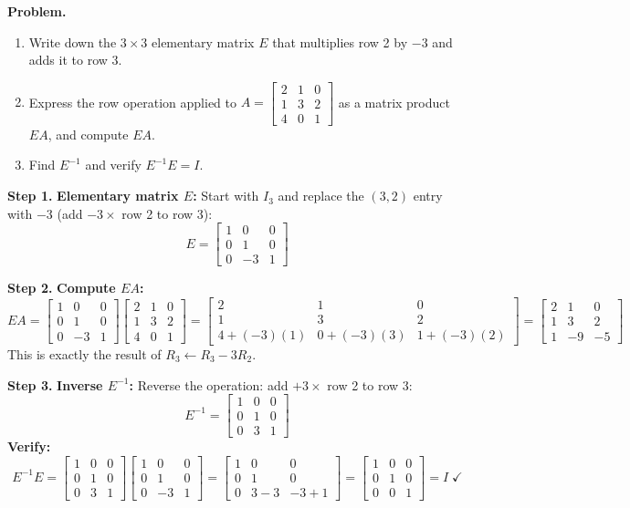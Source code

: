 \documentclass[12pt,a4paper]{article}
\newcommand{\step}[1]{\noindent\textbf{Step #1.}\;}
\newcommand{\mat}[1]{\begin{bmatrix}#1\end{bmatrix}}
\begin{document}
	\begin{tcolorbox}[worked]
		\textbf{Problem.}
		\begin{enumerate}[label=(\alph*), nosep]
			\item Write down the $3\times3$ elementary matrix $E$ that multiplies row 2 by $-3$ and adds it to row 3.
			\item Express the row operation applied to $A = \mat{2&1&0\\1&3&2\\4&0&1}$ as a matrix product $EA$, and compute $EA$.
			\item Find $E^{-1}$ and verify $E^{-1}E = I$.
		\end{enumerate}
		
		\step{1} \textbf{Elementary matrix $E$:} Start with $I_3$ and replace the $(3,2)$ entry with $-3$
		(add $-3 \times$ row 2 to row 3):
		\[
		E = \mat{1 & 0 & 0 \\ 0 & 1 & 0 \\ 0 & -3 & 1}
		\]
		
		\step{2} \textbf{Compute $EA$:}
		\[
		EA = \mat{1&0&0\\0&1&0\\0&-3&1}\mat{2&1&0\\1&3&2\\4&0&1}
		= \mat{2&1&0\\1&3&2\\4+(-3)(1)&0+(-3)(3)&1+(-3)(2)}
		= \mat{2&1&0\\1&3&2\\1&-9&-5}
		\]
		This is exactly the result of $R_3 \leftarrow R_3 - 3R_2$.
		
		\step{3} \textbf{Inverse $E^{-1}$:} Reverse the operation: add $+3\times$ row 2 to row 3:
		\[
		E^{-1} = \mat{1&0&0\\0&1&0\\0&3&1}
		\]
		\textbf{Verify:}
		\[
		E^{-1}E = \mat{1&0&0\\0&1&0\\0&3&1}\mat{1&0&0\\0&1&0\\0&-3&1}
		= \mat{1&0&0\\0&1&0\\0&3-3&-3+1} = \mat{1&0&0\\0&1&0\\0&0&1} = I\;\checkmark
		\]
	\end{tcolorbox}
	
\end{document}
